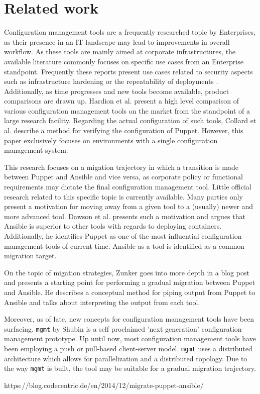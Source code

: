 \section{Related work}\label{sec:relatedwork}
Configuration management tools are a frequently researched topic by Enterprises, as their presence in an IT landscape  may lead to improvements in overall workflow. As these tools are mainly aimed at corporate infrastructures, the available literature commonly focuses on specific use cases from an Enterprise standpoint. Frequently these reports present use cases related to security aspects such as infrastructure hardening \cite{dotson2014security} or the repeatability of deployments \cite{ruiz2015reconstructable}. Additionally, as time progresses and new tools become available, product comparisons are drawn up. Hardion et al. \cite{Hardion2013} present a high level comparison of various configuration management tools on the market from the standpoint of a large research facility. Regarding the actual configuration of such tools, Collard et al. \cite{Collard2015} describe a method for verifying the configuration of Puppet. However, this paper exclusively focuses on environments with a single configuration management system. 

This research focuses on a migation trajectory in which a transition is made between Puppet and Ansible and vice versa, as corporate policy or functional requirements may dictate the final configuration management tool. Little official research related to this specific topic is currently available. Many parties only present a motivation for moving away from a given tool to a (usually) newer and more advanced tool. Dawson et al. \cite{dawson_hall_hecht_2014} presents such a motivation and argues that Ansible is superior to other tools with regards to deploying containers. Additionally, he identifies Puppet as one of the most influential configuration management tools of current time. Ansible as a tool is identified as a common migration target. 

On the topic of migation strategies, Zunker \cite{zunker_2014} goes into more depth in a blog post and presents a starting point for performing a gradual migration between Puppet and Ansible. He describes a conceptual method for piping output from Puppet to Ansible and talks about interpreting the output from each tool.

Moreover, as of late, new concepts for configuration management tools have been surfacing. \texttt{mgmt} by Shubin \cite{shubin2016} is a self proclaimed 'next generation' configuration management prototype.  Up until now, most configuration management tools have been employing a push or pull-based client-server model. \texttt{mgmt} uses a distributed architecture which allows for parallelization and a distributed topology. Due to the way \texttt{mgmt} is built, the tool may be suitable for a gradual migration trajectory.


https://blog.codecentric.de/en/2014/12/migrate-puppet-ansible/
